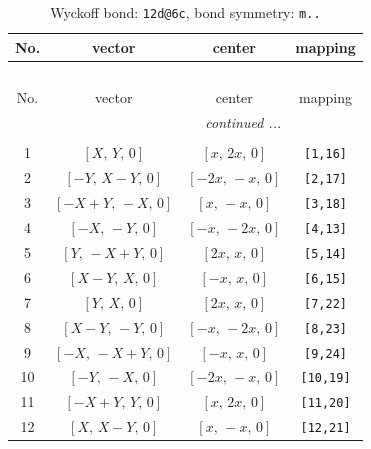 \documentclass[fleqn,8pt]{jsarticle}
\begin{document}
\begin{longtable}{cccc}
\caption{Wyckoff bond: {\tt 12d@6c}, bond symmetry: {\tt m..}}
 \\
 \hline \hline
No. & vector & center & mapping \\ \hline \endfirsthead

\multicolumn{3}{l}{\tablename\ \thetable{}} \\
 \hline \hline
No. & vector & center & mapping \\ \hline \endhead

 \hline \hline
\multicolumn{3}{r}{\footnotesize\it continued ...} \\ \endfoot

 \hline \hline
\multicolumn{3}{r}{} \\ \endlastfoot

1 & $\left[ X,\, Y,\, 0 \right]$ & $\left[ x,\, 2 x,\, 0 \right]$ & {\tt [1,16]} \\ \hline
2 & $\left[ - Y,\, X - Y,\, 0 \right]$ & $\left[ - 2 x,\, - x,\, 0 \right]$ & {\tt [2,17]} \\ \hline
3 & $\left[ - X + Y,\, - X,\, 0 \right]$ & $\left[ x,\, - x,\, 0 \right]$ & {\tt [3,18]} \\ \hline
4 & $\left[ - X,\, - Y,\, 0 \right]$ & $\left[ - x,\, - 2 x,\, 0 \right]$ & {\tt [4,13]} \\ \hline
5 & $\left[ Y,\, - X + Y,\, 0 \right]$ & $\left[ 2 x,\, x,\, 0 \right]$ & {\tt [5,14]} \\ \hline
6 & $\left[ X - Y,\, X,\, 0 \right]$ & $\left[ - x,\, x,\, 0 \right]$ & {\tt [6,15]} \\ \hline
7 & $\left[ Y,\, X,\, 0 \right]$ & $\left[ 2 x,\, x,\, 0 \right]$ & {\tt [7,22]} \\ \hline
8 & $\left[ X - Y,\, - Y,\, 0 \right]$ & $\left[ - x,\, - 2 x,\, 0 \right]$ & {\tt [8,23]} \\ \hline
9 & $\left[ - X,\, - X + Y,\, 0 \right]$ & $\left[ - x,\, x,\, 0 \right]$ & {\tt [9,24]} \\ \hline
10 & $\left[ - Y,\, - X,\, 0 \right]$ & $\left[ - 2 x,\, - x,\, 0 \right]$ & {\tt [10,19]} \\ \hline
11 & $\left[ - X + Y,\, Y,\, 0 \right]$ & $\left[ x,\, 2 x,\, 0 \right]$ & {\tt [11,20]} \\ \hline
12 & $\left[ X,\, X - Y,\, 0 \right]$ & $\left[ x,\, - x,\, 0 \right]$ & {\tt [12,21]} \\
\end{longtable}
\renewcommand{\arraystretch}{1.2}
\end{document}
